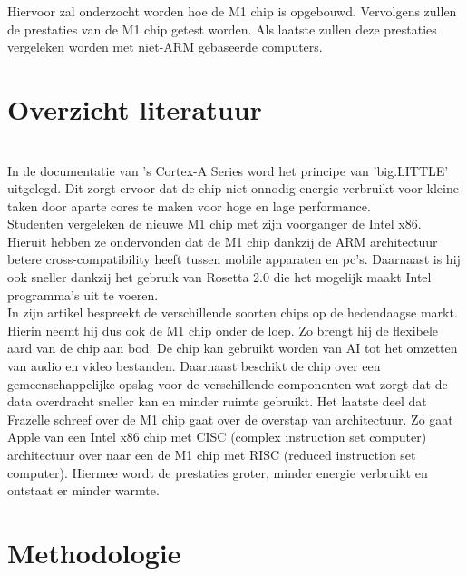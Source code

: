 \documentclass{hogent-article}
\begin{document}
Hiervoor zal onderzocht worden hoe de M1 chip is opgebouwd. Vervolgens zullen de prestaties van de M1 chip getest worden. Als laatste zullen deze prestaties vergeleken worden met niet-ARM gebaseerde computers.



\section{Overzicht literatuur}



\textcite{Apple2020} \\
In de documentatie van \textcite{ARM2014}'s Cortex-A Series word het principe van 'big.LITTLE' uitgelegd. Dit zorgt ervoor dat de chip niet onnodig energie verbruikt voor kleine taken door aparte cores te maken voor hoge en lage performance. \\
Studenten \textcite{Dalakoti2022} vergeleken de nieuwe M1 chip met zijn voorganger de Intel x86. Hieruit hebben ze ondervonden dat de M1 chip dankzij de ARM architectuur betere cross-compatibility heeft tussen mobile apparaten en pc's. Daarnaast is hij ook sneller dankzij het gebruik van Rosetta 2.0 die het mogelijk maakt Intel programma's uit te voeren. \\
In zijn artikel bespreekt \textcite{Frazelle2021} de verschillende soorten chips op de hedendaagse markt. Hierin neemt hij dus ook de M1 chip onder de loep. Zo brengt hij de flexibele aard van de chip aan bod. De chip kan gebruikt worden van AI tot het omzetten van audio en video bestanden. Daarnaast beschikt de chip over een gemeenschappelijke opslag voor de verschillende componenten wat zorgt dat de data overdracht sneller kan en minder ruimte gebruikt. Het laatste deel dat Frazelle schreef over de M1 chip gaat over de overstap van architectuur. Zo gaat Apple van een Intel x86 chip met CISC (complex instruction set computer) architectuur over naar een de M1 chip met RISC (reduced instruction set computer). Hiermee wordt de prestaties groter, minder energie verbruikt en ontstaat er minder warmte. \\

\section{Methodologie}
\end{document}
